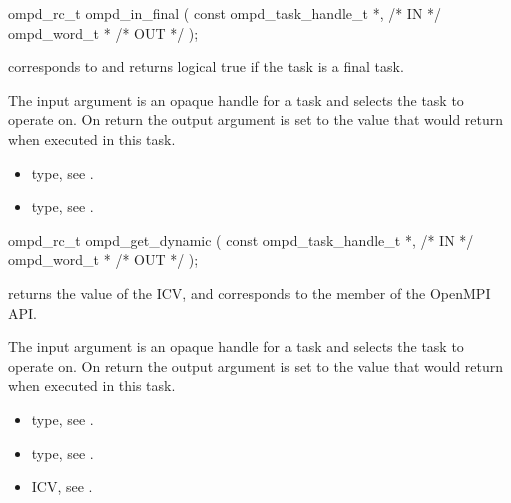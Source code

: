 \summary

\format
\cspecificstart
\begin{boxedcode}
ompd\_rc\_t ompd\_in\_final (
  const ompd\_task\_handle\_t  *,                           /* IN */
  ompd\_word\_t              *                                   /* OUT */
); 
\end{boxedcode}
\cspecificend

\descr
{} corresponds to  and returns
logical true if the task is a final task.

\argdesc
The input argument  is an opaque handle for a task and selects the task to operate on.
On return the output argument  is set to the value that  would return when
executed in this task.

\crossreferences
\begin{itemize}
	\item {} type, see .
	\item {} type, see .
\end{itemize}


\summary

\format
\cspecificstart
\begin{boxedcode}
ompd\_rc\_t ompd\_get\_dynamic (
  const ompd\_task\_handle\_t  *,                           /* IN */
  ompd\_word\_t              *                                   /* OUT */
);
\end{boxedcode}
\cspecificend

\descr
{} returns the value of the
 ICV,
and corresponds to the  member of the OpenMPI API.

\argdesc
The input argument  is an opaque handle for a task and selects the task to operate on.
On return the output argument  is set to the value that  would return when
executed in this task.

\crossreferences
\begin{itemize}
	\item {} type, see .
	\item {} type, see .
	\item {} ICV, see .
\end{itemize}



